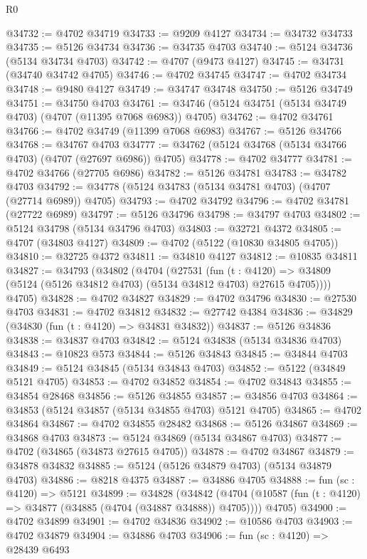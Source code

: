 \begin{lexlean}{R0}
\begin{coremodule}
@34732 := @4702 @34719
@34733 := @9209 @4127
@34734 := @34732 @34733
@34735 := @5126 @34734
@34736 := @34735 @4703
@34740 := @5124 @34736 (@5134 @34734 @4703)
@34742 := @4707 (@9473 @4127)
@34745 := @34731 (@34740 @34742 @4705)
@34746 := @4702 @34745
@34747 := @4702 @34734
@34748 := @9480 @4127
@34749 := @34747 @34748
@34750 := @5126 @34749
@34751 := @34750 @4703
@34761 := @34746 (@5124 @34751 (@5134 @34749 @4703) (@4707 (@11395 @7068 @6983)) @4705)
@34762 := @4702 @34761
@34766 := @4702 @34749 (@11399 @7068 @6983)
@34767 := @5126 @34766
@34768 := @34767 @4703
@34777 := @34762 (@5124 @34768 (@5134 @34766 @4703) (@4707 (@27697 @6986)) @4705)
@34778 := @4702 @34777
@34781 := @4702 @34766 (@27705 @6986)
@34782 := @5126 @34781
@34783 := @34782 @4703
@34792 := @34778 (@5124 @34783 (@5134 @34781 @4703) (@4707 (@27714 @6989)) @4705)
@34793 := @4702 @34792
@34796 := @4702 @34781 (@27722 @6989)
@34797 := @5126 @34796
@34798 := @34797 @4703
@34802 := @5124 @34798 (@5134 @34796 @4703)
@34803 := @32721 @4372
@34805 := @4707 (@34803 @4127)
@34809 := @4702 (@5122 (@10830 @34805 @4705))
@34810 := @32725 @4372
@34811 := @34810 @4127
@34812 := @10835 @34811
@34827 := @34793
    (@34802
      (@4704
        (@27531
          (fun (t : @4120) =>
          @34809 (@5124 (@5126 @34812 @4703) (@5134 @34812 @4703) @27615 @4705))))
      @4705)
@34828 := @4702 @34827
@34829 := @4702 @34796
@34830 := @27530 @4703
@34831 := @4702 @34812
@34832 := @27742 @4384
@34836 := @34829 (@34830 (fun (t : @4120) => @34831 @34832))
@34837 := @5126 @34836
@34838 := @34837 @4703
@34842 := @5124 @34838 (@5134 @34836 @4703)
@34843 := @10823 @573
@34844 := @5126 @34843
@34845 := @34844 @4703
@34849 := @5124 @34845 (@5134 @34843 @4703)
@34852 := @5122 (@34849 @5121 @4705)
@34853 := @4702 @34852
@34854 := @4702 @34843
@34855 := @34854 @28468
@34856 := @5126 @34855
@34857 := @34856 @4703
@34864 := @34853 (@5124 @34857 (@5134 @34855 @4703) @5121 @4705)
@34865 := @4702 @34864
@34867 := @4702 @34855 @28482
@34868 := @5126 @34867
@34869 := @34868 @4703
@34873 := @5124 @34869 (@5134 @34867 @4703)
@34877 := @4702 (@34865 (@34873 @27615 @4705))
@34878 := @4702 @34867
@34879 := @34878 @34832
@34885 := @5124 (@5126 @34879 @4703) (@5134 @34879 @4703)
@34886 := @8218 @4375
@34887 := @34886 @4705
@34888 := fun (sc : @4120) => @5121
@34899 := @34828
    (@34842
      (@4704 (@10587 (fun (t : @4120) => @34877 (@34885 (@4704 (@34887 @34888)) @4705))))
      @4705)
@34900 := @4702 @34899
@34901 := @4702 @34836
@34902 := @10586 @4703
@34903 := @4702 @34879
@34904 := @34886 @4703
@34906 := fun (sc : @4120) => @28439 @6493

\end{coremodule}
\end{lexlean}
